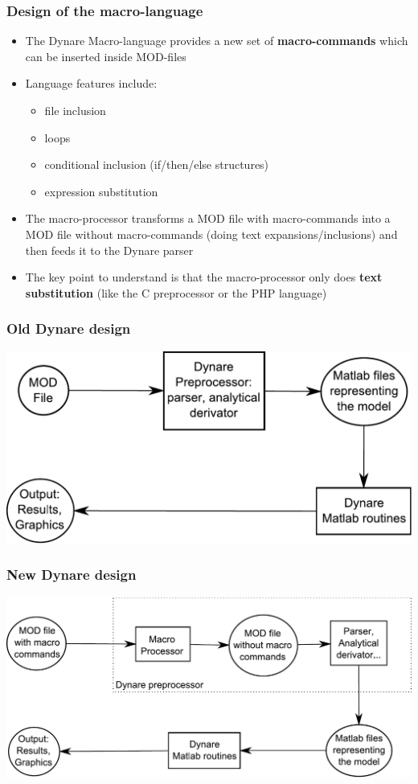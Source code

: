 \documentclass{beamer}
\begin{document}
\begin{frame}
  \frametitle{Design of the macro-language}
  \begin{itemize}
  \item The Dynare Macro-language provides a new set of \textbf{macro-commands} which can be inserted inside MOD-files
  \item Language features include:
    \begin{itemize}
    \item file inclusion
    \item loops
    \item conditional inclusion (if/then/else structures)
    \item expression substitution
    \end{itemize}
  \item The macro-processor transforms a MOD file with macro-commands into a MOD file without macro-commands (doing text expansions/inclusions) and then feeds it to the Dynare parser
  \item The key point to understand is that the macro-processor only does \textbf{text substitution} (like the C preprocessor or the PHP language)
  \end{itemize}
\end{frame}

\begin{frame}
  \frametitle{Old Dynare design}
  \includegraphics[width=0.95\linewidth]{old-design.pdf}
\end{frame}

\begin{frame}
  \frametitle{New Dynare design}
  \includegraphics[width=0.95\linewidth]{new-design.pdf}
\end{frame}
\end{document}
